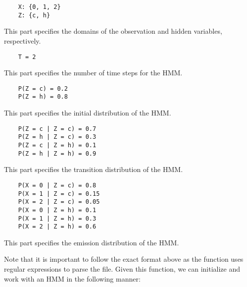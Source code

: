 \documentclass{article}
\theoremstyle{definition}
\begin{document}
\begin{verbatim}
    X: {0, 1, 2}
    Z: {c, h}
\end{verbatim}

This part specifies the domains of the observation and hidden variables, respectively.

\begin{verbatim}
    T = 2
\end{verbatim}

This part specifies the number of time steps for the HMM.

\begin{verbatim}
    P(Z = c) = 0.2
    P(Z = h) = 0.8
\end{verbatim}

This part specifies the initial distribution of the HMM.

\begin{verbatim}
    P(Z = c | Z = c) = 0.7
    P(Z = h | Z = c) = 0.3
    P(Z = c | Z = h) = 0.1
    P(Z = h | Z = h) = 0.9
\end{verbatim}

This part specifies the transition distribution of the HMM.

\begin{verbatim}
    P(X = 0 | Z = c) = 0.8
    P(X = 1 | Z = c) = 0.15
    P(X = 2 | Z = c) = 0.05
    P(X = 0 | Z = h) = 0.1
    P(X = 1 | Z = h) = 0.3
    P(X = 2 | Z = h) = 0.6
\end{verbatim}

This part specifies the emission distribution of the HMM.

Note that it is important to follow the exact format above as the function uses regular expressions to parse the file. Given this function, we can initialize and work with an HMM in the following manner:
\end{document}
